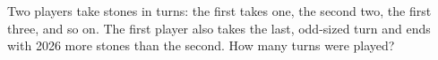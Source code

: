 Two players take stones in turns: the first takes one, the second two, the first three, and so on. The first player also takes the last, odd-sized turn and ends with 2026 more stones than the second. How many turns were played?
